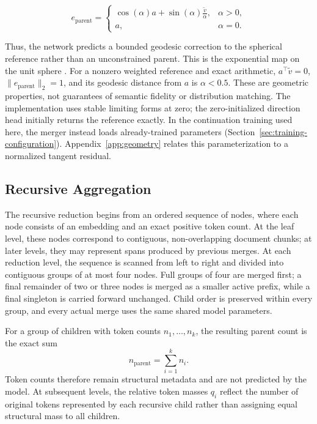 \documentclass[10pt]{article}
\begin{document}
\[
e_{\mathrm{parent}}=
\begin{cases}
\displaystyle
\cos(\alpha)a+\sin(\alpha)\frac{\tilde v}{\alpha},
&\alpha>0,\\[6pt]
a,&\alpha=0.
\end{cases}
\]

Thus, the network predicts a bounded geodesic correction to the spherical
reference rather than an unconstrained parent. This is the exponential map on
the unit sphere \citep{absil-etal-2008-manifolds}. For a nonzero weighted reference
and exact arithmetic, \(a^\top\tilde v=0\),
\(\lVert e_{\mathrm{parent}}\rVert_2=1\), and its geodesic distance from
\(a\) is \(\alpha<0.5\). These are geometric properties, not guarantees of
semantic fidelity or distribution matching. The implementation uses stable
limiting forms at zero; the zero-initialized direction head initially returns
the reference exactly. In the continuation training used here, the merger
instead loads already-trained parameters (Section~\ref{sec:training-configuration}). Appendix~\ref{app:geometry} relates this parameterization to a normalized
tangent residual.

\subsection{Recursive Aggregation}
\label{sec:recursive-aggregation}

The recursive reduction begins from an ordered sequence of nodes, where each node consists of an embedding and an exact positive token count. At the leaf level, these nodes correspond to contiguous, non-overlapping document chunks; at later levels, they may represent spans produced by previous merges. At each reduction level, the sequence is scanned from left to right and divided into contiguous groups of at most four nodes. Full groups of four are merged first; a final remainder of two or three nodes is merged as a smaller active prefix, while a final singleton is carried forward unchanged. Child order is preserved within every group, and every actual merge uses the same shared model parameters.

For a group of children with token counts \(n_1,\ldots,n_k\), the resulting parent count is the exact sum
\[
n_{\mathrm{parent}}=\sum_{i=1}^{k}n_i.
\]
Token counts therefore remain structural metadata and are not predicted by the model. At subsequent levels, the relative token masses \(q_i\) reflect the number of original tokens represented by each recursive child rather than assigning equal structural mass to all children.
\end{document}
